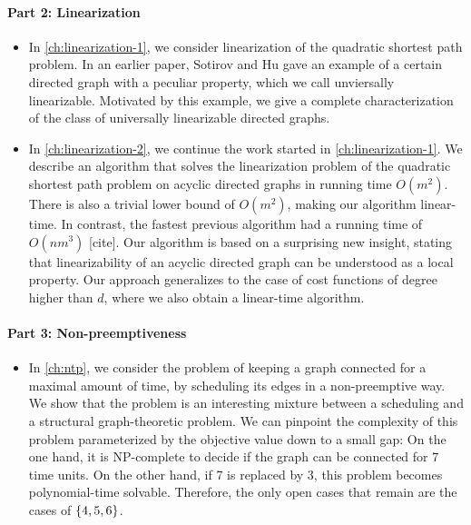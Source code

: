 \paragraph*{Part 2: Linearization}
\begin{itemize}
\item In \cref{ch:linearization-1}, we consider linearization of the quadratic shortest path problem. In an earlier paper, Sotirov and Hu gave an example of a certain directed graph with a peculiar property, which we call unviersally linearizable. Motivated by this example, we give a complete characterization of the class of universally linearizable directed graphs. 

\item In \cref{ch:linearization-2}, we continue the work started in \cref{ch:linearization-1}. 
We describe an algorithm that solves the linearization problem of the quadratic shortest path problem on acyclic directed graphs in running time $O(m^2)$. 
There is also a trivial lower bound of $O(m^2)$, making our algorithm linear-time. 
In contrast, the fastest previous algorithm had a running time of $O(nm^3)$ [cite]. Our algorithm is based on a surprising new insight, stating that linearizability of an acyclic directed graph can be understood as a local property.  Our approach generalizes to the case of cost functions of degree higher than $d$, where we also obtain a linear-time algorithm.
\end{itemize}

\paragraph*{Part 3: Non-preemptiveness}
\begin{itemize}
\item In \cref{ch:ntp}, we consider the problem of keeping a graph connected for a maximal amount of time, by scheduling its edges in a non-preemptive way. 
We show that the problem is an interesting mixture between a scheduling and a structural graph-theoretic problem. We can pinpoint the complexity of this problem parameterized by the objective value down to a small gap: On the one hand, it is NP-complete to decide if the graph can be connected for 7 time units. On the other hand, if 7 is replaced by 3, this problem becomes polynomial-time solvable. Therefore, the only open cases that remain are the cases of $\{ 4,5,6 \}$.
\end{itemize}


